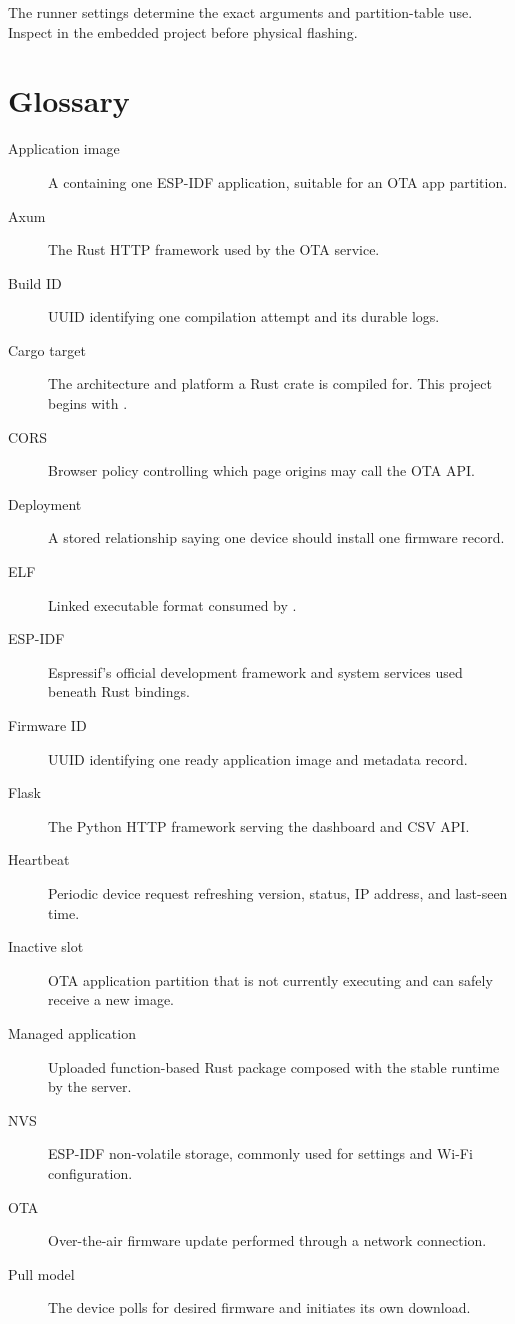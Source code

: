 The runner settings determine the exact  arguments and partition-table use. Inspect  in the embedded project before physical flashing.

\section{Glossary}

\begin{description}
  \item[Application image] A  containing one ESP-IDF application, suitable for an OTA app partition.
  \item[Axum] The Rust HTTP framework used by the OTA service.
  \item[Build ID] UUID identifying one compilation attempt and its durable logs.
  \item[Cargo target] The architecture and platform a Rust crate is compiled for. This project begins with .
  \item[CORS] Browser policy controlling which page origins may call the OTA API.
  \item[Deployment] A stored relationship saying one device should install one firmware record.
  \item[ELF] Linked executable format consumed by .
  \item[ESP-IDF] Espressif's official development framework and system services used beneath Rust bindings.
  \item[Firmware ID] UUID identifying one ready application image and metadata record.
  \item[Flask] The Python HTTP framework serving the dashboard and CSV API.
  \item[Heartbeat] Periodic device request refreshing version, status, IP address, and last-seen time.
  \item[Inactive slot] OTA application partition that is not currently executing and can safely receive a new image.
  \item[Managed application] Uploaded function-based Rust package composed with the stable runtime by the server.
  \item[NVS] ESP-IDF non-volatile storage, commonly used for settings and Wi-Fi configuration.
  \item[OTA] Over-the-air firmware update performed through a network connection.
  \item[Pull model] The device polls for desired firmware and initiates its own download.

\end{description}
